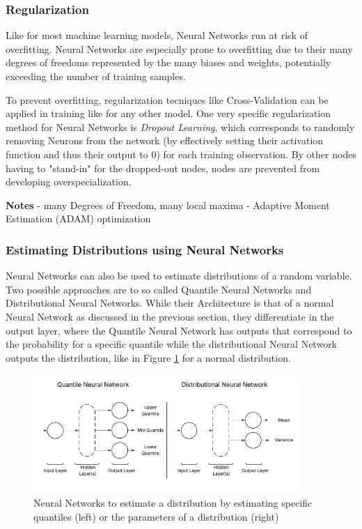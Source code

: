  \subsubsection{Regularization}
 
 Like for most machine learning models, Neural Networks run at risk of overfitting. Neural Networks are especially prone to overfitting due to their many degrees of freedoms represented by the many biases and weights, potentially exceeding the number of training samples.

 To prevent overfitting, regularization tecniques like Cross-Validation can be applied in training like for any other model. One very specific regularization method for Neural Networks is \textit{Dropout Learning}, which corresponds to randomly removing Neurons from the network (by effectively setting their activation function and thus their output to 0) for each training observation. By other nodes having to "stand-in" for the dropped-out nodes, nodes are prevented from developing overspecialization. \cite{James2023}



\textbf{Notes}
- many Degrees of Freedom, many local maxima
- Adaptive Moment Estimation (ADAM) optimization

\subsubsection{Estimating Distributions using Neural Networks }

Neural Networks can also be used to estimate distributions of a random variable. Two possible approaches are to so called Quantile Neural Networks and Distributional Neural Networks. While their Architecture is that of a normal Neural Network as discussed in the previous section, they differentiate in the output layer, where the Quantile Neural Network has outputs that correspond to the probability for a specific quantile while the distributional Neural Network outputs the distribution, like in Figure  \ref{fig:quantile_dist_nn} for a normal distribution.


\begin{figure}[h] 
	\centering
	\includegraphics[width=0.9\textwidth]{figures/modelling/quantile_dist_nn.png} 
	\caption{Neural Networks to estimate a distribution by estimating specific quantiles (left) or the parameters of a distribution (right)}
	\label{fig:quantile_dist_nn}
\end{figure}

